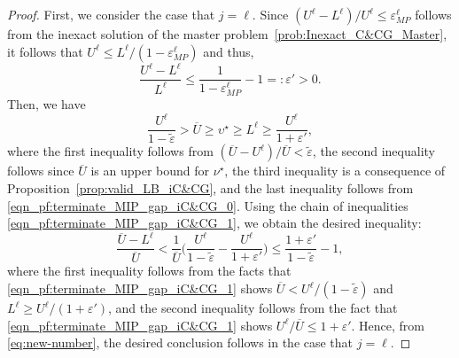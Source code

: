 \documentclass[preprint,review,11pt]{elsarticle}
\theoremstyle{definition}
\theoremstyle{remark}
\newcommand{\epst}{\widetilde{\varepsilon}}
\newcommand{\calO}{\mathcal{O}}
\newcommand{\Ubar}{\overline{U}}
\begin{document}
\begin{proof}
First, we consider the case that $j=\ell$. Since $(U^\ell-L^\ell)/U^\ell\leq\varepsilon_{MP}^\ell$ follows from the inexact solution of the master problem~\eqref{prob:Inexact_C&CG_Master}, it follows that $U^\ell\leq L^\ell/(1-\varepsilon_{MP}^\ell)$ and thus,
%
\begin{equation} \label{eqn_pf:terminate_MIP_gap_iC&CG_0}
  \frac{U^\ell-L^\ell}{L^\ell} \leq \frac{1}{1-\varepsilon_{MP}^\ell}-1 =: \varepsilon' > 0.%
\end{equation}
%
Then, we have
%
\begin{equation} \label{eqn_pf:terminate_MIP_gap_iC&CG_1}
  \frac{U^\ell}{1-\epst} > \Ubar \geq \upsilon^\star \geq L^\ell \geq \frac{U^\ell}{1+\varepsilon'},  
\end{equation}
%
where the first inequality follows from $(\Ubar-U^\ell)/\Ubar<\epst$, the second inequality follows since $\Ubar$ is an upper bound for $\nu^\star$, the third inequality is a consequence of Proposition~\ref{prop:valid_LB_iC&CG}, and the last inequality follows from \eqref{eqn_pf:terminate_MIP_gap_iC&CG_0}. Using the chain of inequalities \eqref{eqn_pf:terminate_MIP_gap_iC&CG_1}, we obtain the desired inequality:
%
\begin{equation}\label{eq:new-number}
  \frac{\Ubar-L^\ell}{\Ubar}< \frac{1}{\Ubar}\Bigg( \frac{U^\ell}{1-\epst}-\frac{U^\ell}{1+\varepsilon'} \Bigg) \leq \frac{1+\varepsilon'}{1-\epst}-1,
\end{equation}%
%
where the first inequality follows from the facts that \eqref{eqn_pf:terminate_MIP_gap_iC&CG_1} shows $\Ubar<U^\ell/(1-\epst)$ and $L^\ell\geq U^\ell/(1+\varepsilon')$, and the second inequality follows from the fact that \eqref{eqn_pf:terminate_MIP_gap_iC&CG_1} shows $U^\ell/\Ubar\leq 1+\varepsilon'$.  Hence, from \eqref{eq:new-number}, the desired conclusion follows in the case that $j=\ell$.


\end{proof}
\end{document}
